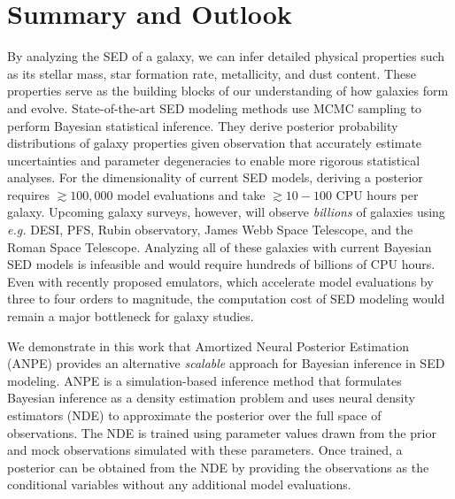 \section{Summary and Outlook} \label{sec:summary}
By analyzing the SED of a galaxy, we can infer detailed physical properties
such as its stellar mass, star formation rate, metallicity, and dust content. 
These properties serve as the building blocks of our understanding of how
galaxies form and evolve. 
State-of-the-art SED modeling methods use MCMC sampling to perform Bayesian
statistical inference. 
They derive posterior probability distributions of galaxy properties given
observation that accurately estimate uncertainties and parameter degeneracies
to enable more rigorous statistical analyses. 
For the dimensionality of current SED models, deriving a posterior requires 
${\gtrsim}100,000$ model evaluations and take ${\gtrsim}10-100$ CPU hours per 
galaxy. 
Upcoming galaxy surveys, however, will observe \emph{billions} of galaxies
using \emph{e.g.} DESI, PFS, Rubin observatory, James Webb Space Telescope, and
the Roman Space Telescope. 
Analyzing all of these galaxies with current Bayesian SED models is infeasible
and would require hundreds of billions of CPU hours.
Even with recently proposed emulators, which accelerate model evaluations by
three to four orders to magnitude, the computation cost of SED modeling would
remain a major bottleneck for galaxy studies. 

We demonstrate in this work that Amortized Neural Posterior Estimation (ANPE)
provides an alternative \emph{scalable} approach for Bayesian inference in SED
modeling.
ANPE is a simulation-based inference method that formulates Bayesian inference
as a density estimation problem and uses neural density estimators (NDE) to
approximate the posterior over the full space of observations. 
The NDE is trained using parameter values drawn from the prior and mock
observations simulated with these parameters.  
Once trained, a posterior can be obtained from the NDE by providing the
observations as the conditional variables without any additional model
evaluations. 

